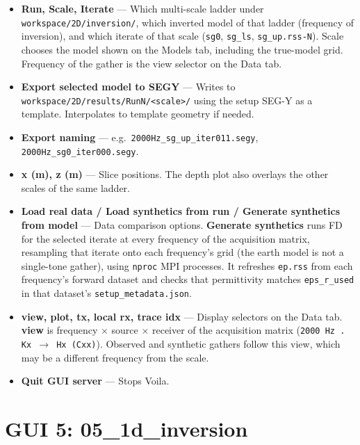 \documentclass[11pt,a4paper]{article}
\begin{document}
\begin{itemize}

  \item \textbf{Run, Scale, Iterate} — Which multi-scale ladder under \texttt{workspace/2D/inversion/}, which inverted model of that ladder (frequency of inversion), and which iterate of that scale (\texttt{sg0}, \texttt{sg\_ls}, \texttt{sg\_up.rss-N}). Scale chooses the model shown on the Models tab, including the true-model grid. Frequency of the gather is the view selector on the Data tab.

  \item \textbf{Export selected model to SEGY} — Writes to \texttt{workspace/2D/results/RunN/<scale>/} using the setup SEG-Y as a template. Interpolates to template geometry if needed.

  \item \textbf{Export naming} — e.g.\ \texttt{2000Hz\_sg\_up\_iter011.segy}, \texttt{2000Hz\_sg0\_iter000.segy}.

  \item \textbf{x (m), z (m)} — Slice positions. The depth plot also overlays the other scales of the same ladder.

  \item \textbf{Load real data / Load synthetics from run / Generate synthetics from model} — Data comparison options. \textbf{Generate synthetics} runs FD for the selected iterate at every frequency of the acquisition matrix, resampling that iterate onto each frequency's grid (the earth model is not a single-tone gather), using \texttt{nproc} MPI processes. It refreshes \texttt{ep.rss} from each frequency's forward dataset and checks that permittivity matches \texttt{eps\_r\_used} in that dataset's \texttt{setup\_metadata.json}.

  \item \textbf{view, plot, tx, local rx, trace idx} — Display selectors on the Data tab. \textbf{view} is frequency $\times$ source $\times$ receiver of the acquisition matrix (\texttt{2000 Hz . Kx $\rightarrow$ Hx (Cxx)}). Observed and synthetic gathers follow this view, which may be a different frequency from the scale.

  \item \textbf{Quit GUI server} — Stops Voila.

\end{itemize}

\section{GUI 5: 05\_1d\_inversion}
\end{document}
